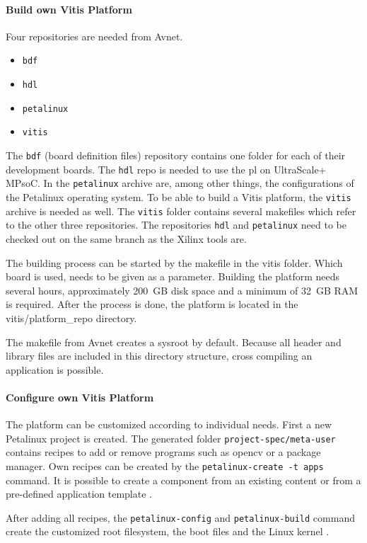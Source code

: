 \paragraph{Build own Vitis Platform}
Four repositories are needed from Avnet.
\begin{itemize}
	\item \texttt{bdf}
	\item \texttt{hdl}
	\item \texttt{petalinux}
	\item \texttt{vitis}
\end{itemize}

The \texttt{bdf} (board definition files) repository contains one folder for each of their development boards.
The \texttt{hdl} repo is needed to use the \acrfull{pl} on UltraScale+ MPsoC.
In the \texttt{petalinux} archive are, among other things, the configurations of the Petalinux operating system.
To be able to build a Vitis platform, the \texttt{vitis} archive is needed as well.
The \texttt{vitis} folder contains several makefiles which refer to the other three repositories.
The repositories \texttt{hdl} and \texttt{petalinux} need to be checked out on the same branch as the Xilinx tools are.

The building process can be started by the makefile in the vitis folder.
Which board is used, needs to be given as a parameter.
Building the platform needs several hours, approximately \SI{200}{GB} disk space and a minimum of \SI{32}{GB} RAM is required.
After the process is done, the platform is located in the vitis/platform\_repo directory.

The makefile from Avnet creates a sysroot by default.
Because all header and library files are included in this directory structure, cross compiling an application is possible.

\paragraph{Configure own Vitis Platform}
The platform can be customized according to individual needs.
First a new Petalinux project is created.
The generated folder \texttt{project-spec/meta-user} contains recipes to add or remove programs such as \acrshort{opencv} or a package manager.
Own recipes can be created by the \texttt{petalinux-create -t apps} command.
It is possible to create a component from an existing content or from a pre-defined application template \cite{petalinux_commandline_guide}.

After adding all recipes, the \texttt{petalinux-config} and \texttt{petalinux-build} command create the customized root filesystem, the boot files and the Linux kernel \cite{petalinux_user_guide}.

